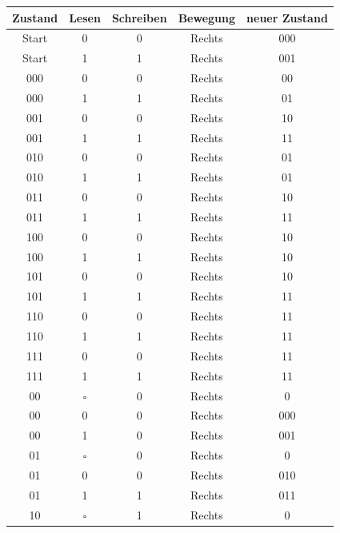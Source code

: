 \begin{table}
 \begin{center}
  \begin{tabular}{ccccc}
   \hline
    Zustand & Lesen     & Schreiben & Bewegung & neuer Zustand \\
   \hline \hline
    Start   & 0         & 0         & Rechts   & 000 \\
    Start   & 1         & 1         & Rechts   & 001 \\
    000     & 0         & 0         & Rechts   & 00 \\
    000     & 1         & 1         & Rechts   & 01 \\
    001     & 0         & 0         & Rechts   & 10 \\
    001     & 1         & 1         & Rechts   & 11 \\
    010     & 0         & 0         & Rechts   & 01 \\
    010     & 1         & 1         & Rechts   & 01 \\
    011     & 0         & 0         & Rechts   & 10 \\
    011     & 1         & 1         & Rechts   & 11 \\
    100     & 0         & 0         & Rechts   & 10 \\
    100     & 1         & 1         & Rechts   & 10 \\
    101     & 0         & 0         & Rechts   & 10 \\
    101     & 1         & 1         & Rechts   & 11 \\
    110     & 0         & 0         & Rechts   & 11 \\
    110     & 1         & 1         & Rechts   & 11 \\
    111     & 0         & 0         & Rechts   & 11 \\
    111     & 1         & 1         & Rechts   & 11 \\
    00      & $\square$ & 0         & Rechts   & 0 \\
    00      & 0         & 0         & Rechts   & 000 \\
    00      & 1         & 0         & Rechts   & 001 \\
    01      & $\square$ & 0         & Rechts   & 0 \\
    01      & 0         & 0         & Rechts   & 010 \\
    01      & 1         & 1         & Rechts   & 011 \\
    10      & $\square$ & 1         & Rechts   & 0 \\

\end{tabular}
\end{center}
\end{table}
